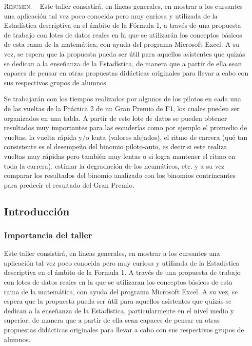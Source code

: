 \begin{center}
	\begin{minipage}{0.75\linewidth} \small
		\textsc{Resumen}. ~
		Este taller consistirá, en líneas generales, en mostrar a los cursantes una aplicación tal vez poco conocida pero muy curiosa y utilizada de la Estadística descriptiva en el ámbito de la Fórmula 1, a través de una propuesta de trabajo con lotes de datos reales en la que se utilizarán los conceptos básicos de esta rama de la matemática, con ayuda del programa Microsoft Excel. A su vez, se espera que la propuesta pueda ser útil para aquellos asistentes que quizás se dedican a la enseñanza de la Estadística, de manera que a partir de ella sean capaces de pensar en otras propuestas didácticas originales para llevar a cabo con sus respectivos grupos de alumnos.
		
		Se trabajarán con los tiempos realizados por algunos de los pilotos en cada una de las vueltas de la Práctica 2 de un Gran Premio de F1, los cuales pueden ser organizados en una tabla. A partir de este lote de datos se pueden obtener resultados muy importantes para las escuderías como por ejemplo el promedio de vueltas, la vuelta rápida y/o lenta (valores alejados), el ritmo de carrera (qué tan consistente es el desempeño del binomio piloto-auto, es decir si este realiza vueltas muy rápidas pero también muy lentas o si logra mantener el ritmo en toda la carrera), estimar la degradación de los neumáticos, etc. y a su vez comparar los resultados del binomio analizado con los binomios contrincantes para predecir el resultado del Gran Premio.
	\end{minipage}
\end{center}

\subsection{Introducción}

\subsubsection{Importancia del taller}

Este taller consistirá, en lineas generales, en mostrar a los cursantes una aplicación tal vez poco conocida pero muy curiosa y utilizada de la Estadística descriptiva en el ámbito de la Formula 1. A través de una propuesta de trabajo con lotes de datos reales en la que se utilizaran los conceptos básicos de esta rama de la matemática, con ayuda del programa Microsoft Excel. A su vez, se espera que la propuesta pueda ser útil para aquellos asistentes que quizás se dedican a la enseñanza de la Estadística, particularmente en el nivel medio y superior, de manera que a partir de ella sean capaces de pensar en otras propuestas didácticas originales para llevar a cabo con sus respectivos grupos de alumnos.

